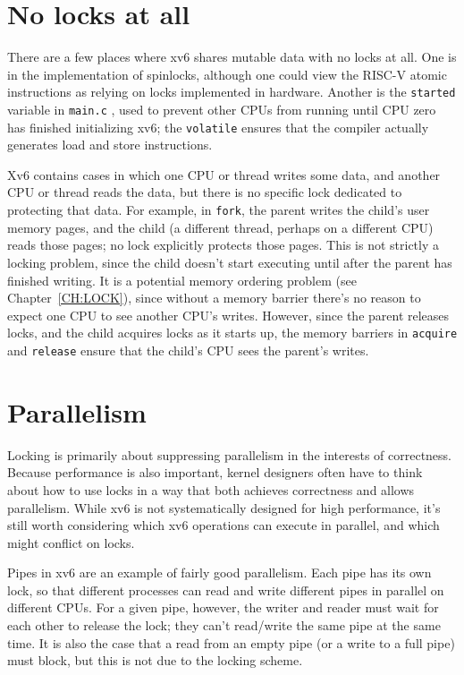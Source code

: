 \section{No locks at all}

There are a few places where xv6 shares mutable data with no locks at
all. One is in the implementation of spinlocks, although one could
view the RISC-V atomic instructions as relying on locks implemented in
hardware. Another is the {\tt started} variable in {\tt main.c}
, used to prevent other CPUs from
running until CPU zero has finished initializing xv6;
the {\tt volatile} ensures that the compiler actually generates
load and store instructions.

Xv6 contains cases in which one CPU or thread writes some data, and
another CPU or thread reads the data, but there is no specific lock
dedicated to protecting that data. For example, in {\tt fork}, the
parent writes the child's user memory pages, and the child (a
different thread, perhaps on a different CPU) reads those pages; no
lock explicitly protects those pages. This is not strictly a locking
problem, since the child doesn't start executing until after the parent has
finished writing. It is a potential memory ordering problem
(see Chapter~\ref{CH:LOCK}), since without a memory barrier there's no
reason to expect one CPU to see another CPU's writes. However, since
the parent releases locks, and the child acquires locks as it starts
up, the memory barriers in {\tt acquire} and {\tt release}
ensure that the child's CPU sees the parent's writes.

\section{Parallelism}

Locking is primarily about suppressing parallelism in the interests of
correctness. Because performance is also important, kernel designers
often have to think about how to use locks in a way that both achieves 
correctness and allows parallelism. While xv6 is not systematically
designed for high performance, it's still worth considering which xv6
operations can execute in parallel, and which might conflict on locks.

Pipes in xv6 are an example of fairly good parallelism. Each pipe has
its own lock, so that different processes can read and write 
different pipes in parallel on different CPUs. For a given pipe,
however, the writer and reader must wait for each other to release the
lock; they can't read/write the same pipe at the same time. It is also
the case that a read from an empty pipe (or a write to a full pipe)
must block, but this is not due to the locking scheme.

